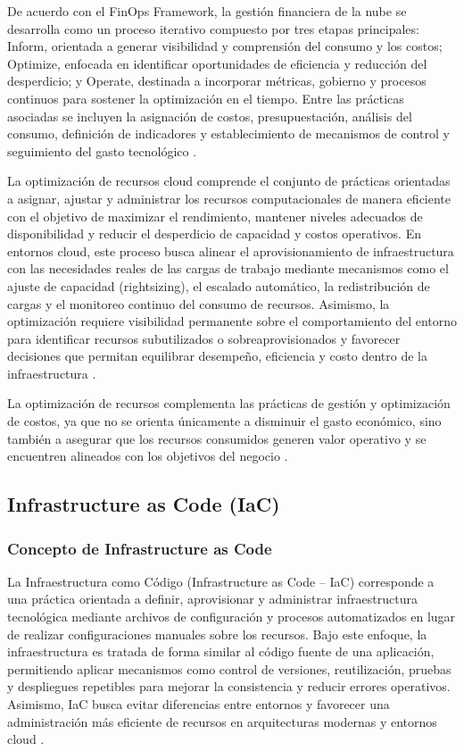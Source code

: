 De acuerdo con el FinOps Framework, la gestión financiera de la nube se desarrolla como un proceso iterativo compuesto por tres etapas principales: Inform, orientada a generar visibilidad y comprensión del consumo y los costos; Optimize, enfocada en identificar oportunidades de eficiencia y reducción del desperdicio; y Operate, destinada a incorporar métricas, gobierno y procesos continuos para sostener la optimización en el tiempo. Entre las prácticas asociadas se incluyen la asignación de costos, presupuestación, análisis del consumo, definición de indicadores y establecimiento de mecanismos de control y seguimiento del gasto tecnológico \parencite{FinOpsFramework2026}.

La optimización de recursos cloud comprende el conjunto de prácticas orientadas a asignar, ajustar y administrar los recursos computacionales de manera eficiente con el objetivo de maximizar el rendimiento, mantener niveles adecuados de disponibilidad y reducir el desperdicio de capacidad y costos operativos. En entornos cloud, este proceso busca alinear el aprovisionamiento de infraestructura con las necesidades reales de las cargas de trabajo mediante mecanismos como el ajuste de capacidad (rightsizing), el escalado automático, la redistribución de cargas y el monitoreo continuo del consumo de recursos. Asimismo, la optimización requiere visibilidad permanente sobre el comportamiento del entorno para identificar recursos subutilizados o sobreaprovisionados y favorecer decisiones que permitan equilibrar desempeño, eficiencia y costo dentro de la infraestructura \parencite{IBM2026, FinOpsFramework2026}.

La optimización de recursos complementa las prácticas de gestión y optimización de costos, ya que no se orienta únicamente a disminuir el gasto económico, sino también a asegurar que los recursos consumidos generen valor operativo y se encuentren alineados con los objetivos del negocio \parencite{IBM2026, FinOps2026}.

\subsection{Infrastructure as Code (IaC)}

\subsubsection{Concepto de Infrastructure as Code}

La Infraestructura como Código (Infrastructure as Code -- IaC) corresponde a una práctica orientada a definir, aprovisionar y administrar infraestructura tecnológica mediante archivos de configuración y procesos automatizados en lugar de realizar configuraciones manuales sobre los recursos. Bajo este enfoque, la infraestructura es tratada de forma similar al código fuente de una aplicación, permitiendo aplicar mecanismos como control de versiones, reutilización, pruebas y despliegues repetibles para mejorar la consistencia y reducir errores operativos. Asimismo, IaC busca evitar diferencias entre entornos y favorecer una administración más eficiente de recursos en arquitecturas modernas y entornos cloud \parencite{Microsoft2025}.

